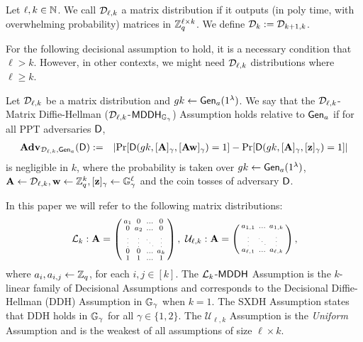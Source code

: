 
\begin{definition}   \label{def:matrixdef}
Let $\ell,k \in \mathbb{N}$.
We call $\mathcal{D}_{\ell,k}$ a matrix distribution if it outputs (in poly time, with overwhelming probability) matrices in $\mathbb{Z}_q^{\ell \times k}$. We define $\mathcal{D}_k := \mathcal{D}_{k+1,k}$. 
\end{definition}

For the following decisional assumption to hold, it is a necessary condition that $\ell>k$. However, in other contexts, we might need $\mathcal{D}_{\ell,k}$ distributions where 
$\ell \geq k$. 

\begin{definition}\label{def:mdh}
Let $\mathcal{D}_{\ell,k}$ be a matrix distribution  and ${gk}\gets \mathsf{Gen}_a(1^\lambda)$. We say that the $\mathcal{D}_{\ell,k}$-Matrix Diffie-Hellman ($\mathcal{D}_{\ell,k}$-$\mathsf{MDDH}_{\mathbb{G}_\gamma}$)
Assumption holds relative to $\mathsf{Gen}_a$ if for all PPT adversaries $\mathsf{D}$,
\begin{eqnarray*}
\mathbf{Adv}_{\mathcal{D}_{\ell,k},\mathsf{Gen}_a}(\mathsf{D}) & := &
    \left|
        \Pr[\mathsf{D}({gk},[\mathbf{{A}}]_\gamma,[\mathbf{{A}}\mathbf{w}]_\gamma)=1]-
        \Pr[\mathsf{D}({gk},[\mathbf{{A}}]_\gamma, [\mathbf{z}]_\gamma) =1]
    \right|
\end{eqnarray*}
is negligible in $k$,
where the probability is taken over ${gk} \gets \mathsf{Gen}_a(1^\lambda)$, $\mathbf{{A}} \gets \mathcal{D}_{\ell,k}, \mathbf{w} \gets \mathbb{Z}_q^k, [\mathbf{z}]_\gamma  \gets \mathbb{G}_\gamma^{\ell}$ and the coin tosses of adversary $\mathsf{D}$.
\end{definition}
 

In this paper we will refer to the following matrix distributions: 
\[
\distlin_{k}:\matrA = \left( \begin{smallmatrix}
    a_1 & 0 &  \ldots & 0 \\
    0 &  a_2 &  \ldots & 0\\
    \tiny{\vdots} &  \tiny{\vdots}  &  \tiny{\ddots} & \tiny{\vdots} \\
    0 & 0 &  \ldots  & a_{k}\\
    1 & 1 & \ldots & 1
\end{smallmatrix} \right),
\ 
\mathcal{U}_{\ell,k}: \matrA = \left( \begin{smallmatrix}
    a_{1,1} &  \ldots & a_{1,k}  \\
    \tiny{\vdots} & \tiny{\ddots}  & \tiny{\vdots} \\
    a_{\ell,1} &  \ldots &  a_{\ell,k} 
\end{smallmatrix} \right),
\]
where $a_i,a_{i,j}\leftarrow \mathbb{Z}_q$, for each $i,j\in[k]$.  The $\mathcal{L}_{k}$-$\mathsf{MDDH}$ Assumption is the $k$-linear family of Decisional Assumptions
and corresponds to 
 the Decisional Diffie-Hellman (DDH)
Assumption in $\mathbb{G}_\gamma$ when $k=1$. The SXDH Assumption states that DDH holds in $\mathbb{G}_\gamma$ for all $\gamma \in \{1,2\}$. The $\mathcal{U}_{\ell,k}$ Assumption is the \textit{Uniform} Assumption and is the weakest of all assumptions of size $\ell \times k$. 

